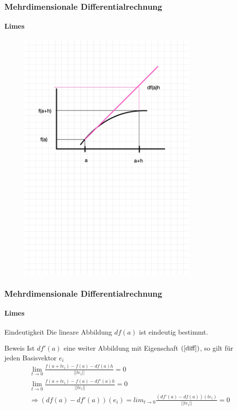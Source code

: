 \documentclass{beamer}
\begin{document}
\begin{frame}
    \frametitle{Mehrdimensionale Differentialrechnung}
\framesubtitle{Limes}

\begin{figure}[H]
      \centering
    \includegraphics[width=0.8\textwidth]{images/df}
\end{figure}

 \end{frame}



\begin{frame}
    \frametitle{Mehrdimensionale Differentialrechnung}
\framesubtitle{Limes}
    \begin{block}{Eindeutigkeit}
Die lineare Abbildung $df(a)$ ist eindeutig bestimmt.
\end{block}
    \begin{block}{Beweis}
Ist $df'(a)$ eine weiter Abbildung mit Eigenschaft $(\ref{diff})$, so gilt für jeden Basisvektor $e_i$
\begin{align}
& \lim_{t \to 0} \frac{f(a+te_i) - f(a) - df(a)h }{||t e_i||} = 0 \\
 & \lim_{t \to 0} \frac{f(a+te_i) - f(a) - df'(a)h }{||t e_i||}  = 0\\
& \Rightarrow (df(a) - df'(a))(e_i) = lim_{t \to 0}\frac{(df'(a) - df(a))(t e_i)}{||te_i||} = 0
\end{align}
\end{block}
 \end{frame}
\end{document}
